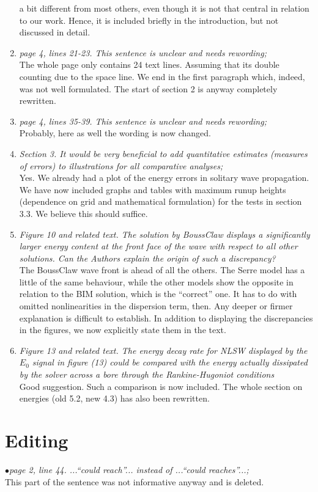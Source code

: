 \documentclass[11pt]{article}
\begin{document}
\begin{enumerate}
a bit different from most others, even though it is not that central in relation to our work. Hence, it is included briefly in the introduction, but not discussed in detail.    
\item{\em page 4, lines 21-23. This sentence is unclear and needs rewording;}\\
The whole page only contains 24 text lines. Assuming that its double counting due to
the space line. We end in the first paragraph which, indeed, was not well formulated. 
The start of section 2 is anyway completely rewritten.  
\item{\em page 4, lines 35-39. This sentence is unclear and needs rewording;}\\
Probably, here as well the wording is now changed.
\item{\em Section 3. It would be very beneficial to add quantitative estimates (measures of
errors) to illustrations for all comparative analyses;}\\
Yes. We already had a plot of the energy errors in solitary wave propagation.
We have now included graphs and tables with maximum runup heights (dependence on grid and mathematical formulation) for the tests in section 3.3. We believe this should suffice.  
\item{\em Figure 10 and related text. The solution by BoussClaw displays a significantly larger
energy content at the front face of the wave with respect to all other solutions. Can
the Authors explain the origin of such a discrepancy?}\\
The BoussClaw wave front is ahead of all the others. The Serre model has a little of the same
behaviour, while the other models show the opposite in relation to the BIM solution, which is
the ``correct'' one. It has to do with omitted nonlinearities in the dispersion term, then. Any deeper or firmer
explanation is difficult to establish. In addition to displaying the discrepancies in the figures, we now explicitly state them in the text.
\item{\em Figure 13 and related text. The energy decay rate for NLSW displayed by the $E_0$
signal in figure (13) could be compared with the energy actually dissipated by the
solver across a bore through the Rankine-Hugoniot conditions}\\
Good suggestion. Such a comparison is now included.
The whole section on energies (old 5.2, new 4.3) has also been rewritten.
\end{enumerate}
\section*{Editing}
$\bullet${\em  page 2, line 44. ...“could reach”... instead of ...“could reaches”...;}\\
This part of the sentence was not informative anyway and is deleted.

\end{document}
